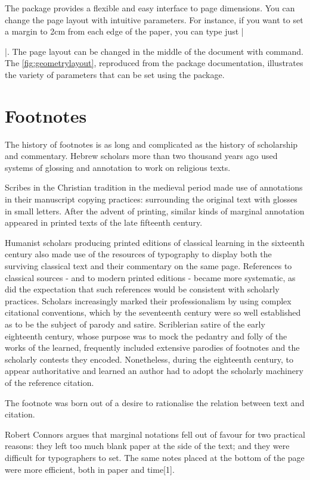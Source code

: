  The  package provides a flexible and easy interface to page dimensions.
 You can change the page layout with intuitive parameters. For instance,
 if you want to set a margin to 2cm from each edge of the paper,
 you can type just |\usepackage[margin=2cm]{geometry}|. 
 The page layout can be changed in the middle of the document
 with  command.  The \ref{fig:geometrylayout}, reproduced from the package documentation, illustrates the variety of parameters that can be set using the package.


\section{Footnotes}
The history of footnotes is as long and complicated as the history of scholarship and commentary. Hebrew scholars more than two thousand years ago used systems of glossing and annotation to work on religious texts. 

Scribes in the Christian tradition in the medieval period made use of annotations in their manuscript copying practices: surrounding the original text with glosses in small letters. After the advent of printing, similar kinds of marginal annotation appeared in printed texts of the late fifteenth century. 

Humanist scholars producing printed editions of classical learning in the sixteenth century also made use of the resources of typography to display both the surviving classical text and their commentary on the same page. References to classical sources - and to modern printed editions - became more systematic, as did the expectation that such references would be consistent with scholarly practices. Scholars increasingly marked their professionalism by using complex citational conventions, which by the seventeenth century were so well established as to be the subject of parody and satire. Scriblerian satire of the early eighteenth century, whose purpose was to mock the pedantry and folly of the works of the learned, frequently included extensive parodies of footnotes and the scholarly contests they encoded. Nonetheless, during the eighteenth century, to appear authoritative and learned an author had to adopt the scholarly machinery of the reference citation.

The footnote was born out of a desire to rationalise the relation between text and citation. 

Robert Connors argues that marginal notations fell out of favour for two practical reasons: they left too much blank paper at the side of the text; and they were difficult for typographers to set. The same notes placed at the bottom of the page were more efficient, both in paper and time[1]. 

